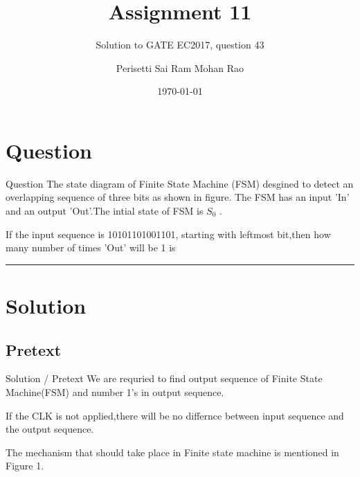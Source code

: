 \documentclass{beamer}
\title{Assignment 11}
\subtitle{Solution to GATE EC2017, question 43}
\author{Perisetti Sai Ram Mohan Rao}
\institute{IIIT Raichur}
\date{\today}
\begin{document}
\begin{frame}
\maketitle
\end{frame}

\section{Question}
\begin{frame}{Question}
The state diagram of Finite State Machine (FSM) desgined to detect an overlapping sequence of three bits as shown in figure. The FSM has an input 'In' and an output 'Out'.The intial state of FSM is $S_0$ .

\begin{figure}[h]
\centering
\scalebox{0.5}{
}
\caption{}
\label{figure 1}
\end{figure}

If the input sequence is 10101101001101, starting with leftmost bit,then how many number of times 'Out' will be 1 is \rule{2cm}{0.10mm}
\end{frame}

\section{Solution}

\subsection{Pretext}
\begin{frame}{Solution / Pretext}
We are requried to find output sequence of Finite State Machine(FSM) and number 1's in output sequence.

\begin{figure}[h]
    \centering
    \scalebox{0.6}{
     }
    \label{fig:ques_}
\end{figure}
If the CLK is not applied,there will be no differnce between input sequence and the output sequence.

The mechanism that should take place in Finite state machine is mentioned in Figure 1.

\end{frame}
\end{document}
